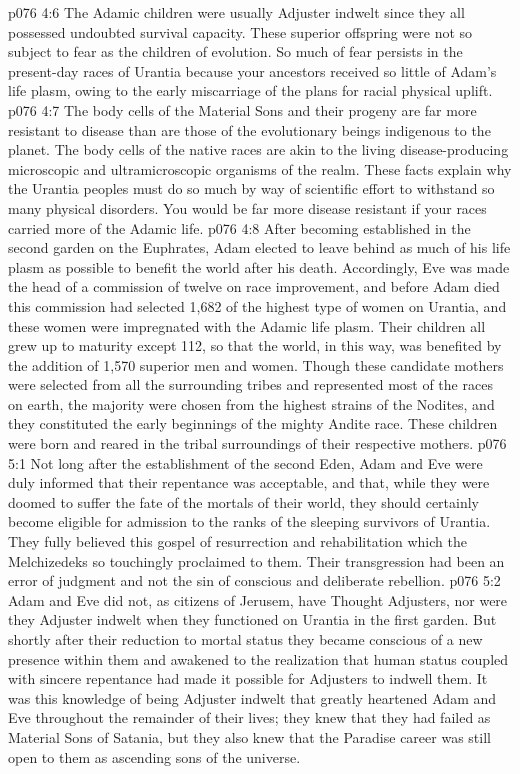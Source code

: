 \vs p076 4:6 The Adamic children were usually Adjuster indwelt since they all possessed undoubted survival capacity. These superior offspring were not so subject to fear as the children of evolution. So much of fear persists in the present\hyp{}day races of Urantia because your ancestors received so little of Adam’s life plasm, owing to the early miscarriage of the plans for racial physical uplift.
\vs p076 4:7 The body cells of the Material Sons and their progeny are far more resistant to disease than are those of the evolutionary beings indigenous to the planet. The body cells of the native races are akin to the living disease\hyp{}producing microscopic and ultramicroscopic organisms of the realm. These facts explain why the Urantia peoples must do so much by way of scientific effort to withstand so many physical disorders. You would be far more disease resistant if your races carried more of the Adamic life.
\pc \vs p076 4:8 After becoming established in the second garden on the Euphrates, Adam elected to leave behind as much of his life plasm as possible to benefit the world after his death. Accordingly, Eve was made the head of a commission of twelve on race improvement, and before Adam died this commission had selected 1,682 of the highest type of women on Urantia, and these women were impregnated with the Adamic life plasm. Their children all grew up to maturity except 112, so that the world, in this way, was benefited by the addition of 1,570 superior men and women. Though these candidate mothers were selected from all the surrounding tribes and represented most of the races on earth, the majority were chosen from the highest strains of the Nodites, and they constituted the early beginnings of the mighty Andite race. These children were born and reared in the tribal surroundings of their respective mothers.\plusone
{}
\vs p076 5:1 Not long after the establishment of the second Eden, Adam and Eve were duly informed that their repentance was acceptable, and that, while they were doomed to suffer the fate of the mortals of their world, they should certainly become eligible for admission to the ranks of the sleeping survivors of Urantia. They fully believed this gospel of resurrection and rehabilitation which the Melchizedeks so touchingly proclaimed to them. Their transgression had been an error of judgment and not the sin of conscious and deliberate rebellion.
\vs p076 5:2 Adam and Eve did not, as citizens of Jerusem, have Thought Adjusters, nor were they Adjuster indwelt when they functioned on Urantia in the first garden. But shortly after their reduction to mortal status they became conscious of a new presence within them and awakened to the realization that human status coupled with sincere repentance had made it possible for Adjusters to indwell them. It was this knowledge of being Adjuster indwelt that greatly heartened Adam and Eve throughout the remainder of their lives; they knew that they had failed as Material Sons of Satania, but they also knew that the Paradise career was still open to them as ascending sons of the universe.
